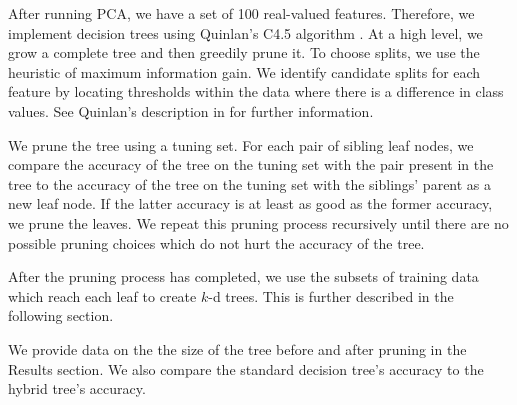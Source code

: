 After running PCA, we have a set of 100 real-valued features. 
Therefore, we implement decision trees using Quinlan's C4.5 algorithm \cite{quinlan2014c4}.
At a high level, we grow a complete tree and then greedily prune it.
To choose splits, we use the heuristic of maximum information gain.  We identify candidate splits for each feature by locating thresholds within the data where there is a difference in class values.  See Quinlan's description in \cite{quinlan1996improved} for further information.

We prune the tree using a tuning set. For each pair of sibling leaf nodes, we compare the accuracy of the tree on the tuning set with the pair present in the tree to the accuracy of the tree on the tuning set with the siblings' parent as a new leaf node.
If the latter accuracy is at least as good as the former accuracy, we prune the leaves.  We repeat this pruning process recursively until there are no possible pruning choices which do not hurt the accuracy of the tree.

After the pruning process has completed, we use the subsets of training data which reach each leaf to create $k$-d trees.  This is further described in the following section.

We provide data on the the size of the tree before and after pruning in the Results section.  We also compare the standard decision tree's accuracy to the hybrid tree's accuracy.
